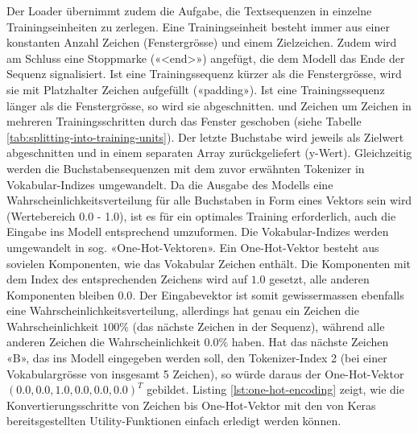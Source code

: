 Der Loader übernimmt zudem die Aufgabe, die Textsequenzen in einzelne Trainingseinheiten zu zerlegen.
Eine Trainingseinheit besteht immer aus einer konstanten Anzahl Zeichen (Fenstergrösse) und einem Zielzeichen.
Zudem wird am Schluss eine Stoppmarke («<end>») angefügt, die dem Modell das Ende der Sequenz signalisiert.
Ist eine Trainingssequenz kürzer als die Fenstergrösse, wird sie mit Platzhalter Zeichen aufgefüllt («padding»).
Ist eine Trainingssequenz länger als die Fenstergrösse, so wird sie abgeschnitten.
und Zeichen um Zeichen in mehreren Trainingsschritten durch das Fenster geschoben (siehe Tabelle \ref{tab:splitting-into-training-units}).
Der letzte Buchstabe wird jeweils als Zielwert abgeschnitten und in einem separaten Array zurückgeliefert (y-Wert).
Gleichzeitig werden die Buchstabensequenzen mit dem zuvor erwähnten Tokenizer in Vokabular-Indizes umgewandelt.
Da die Ausgabe des Modells eine Wahrscheinlichkeitsverteilung für alle Buchstaben in Form eines Vektors sein wird (Wertebereich 0.0 - 1.0), ist es
für ein optimales Training erforderlich, auch die Eingabe ins Modell entsprechend umzuformen.
Die Vokabular-Indizes werden umgewandelt in sog. «One-Hot-Vektoren».
Ein One-Hot-Vektor besteht aus sovielen Komponenten, wie das Vokabular Zeichen enthält.
Die Komponenten mit dem Index des entsprechenden Zeichens wird auf $ 1.0 $ gesetzt, alle anderen Komponenten bleiben $ 0.0 $.
Der Eingabevektor ist somit gewissermassen ebenfalls eine Wahrscheinlichkeitsverteilung, allerdings hat genau ein Zeichen die Wahrscheinlichkeit $ 100\% $ (das nächste Zeichen in der Sequenz), während
alle anderen Zeichen die Wahrscheinlichkeit $0.0\%$ haben.
Hat das nächste Zeichen «B», das ins Modell eingegeben werden soll, den Tokenizer-Index 2 (bei einer Vokabulargrösse von insgesamt 5 Zeichen), so würde daraus der One-Hot-Vektor $ (0.0, 0.0, 1.0, 0.0, 0.0, 0.0)^{T} $ gebildet.
Listing \ref{lst:one-hot-encoding} zeigt, wie die Konvertierungsschritte von Zeichen bis One-Hot-Vektor mit den von Keras bereitsgestellten Utility-Funktionen einfach erledigt werden können.

